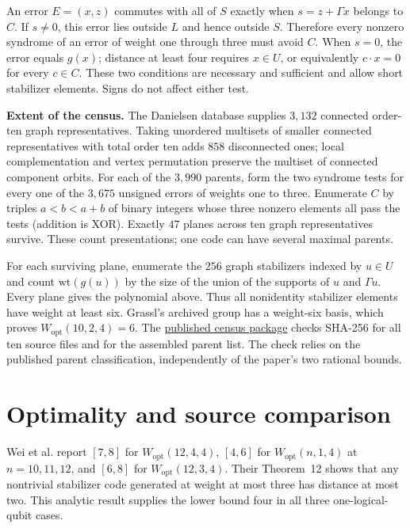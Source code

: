 \documentclass[11pt]{article}
\newcommand{\W}{W_{\mathrm{opt}}}
\begin{document}
An error $E=(x,z)$ commutes with all of $S$ exactly when $s=z+\Gamma x$ belongs to $C$. If $s\ne0$, this error lies outside $L$ and hence outside $S$. Therefore every nonzero syndrome of an error of weight one through three must avoid $C$. When $s=0$, the error equals $g(x)$; distance at least four requires $x\in U$, or equivalently $c\cdot x=0$ for every $c\in C$. These two conditions are necessary and sufficient and allow short stabilizer elements. Signs do not affect either test.

\textbf{Extent of the census.} The Danielsen database supplies $3{,}132$ connected order-ten graph representatives. Taking unordered multisets of smaller connected representatives with total order ten adds $858$ disconnected ones; local complementation and vertex permutation preserve the multiset of connected component orbits. For each of the $3{,}990$ parents, form the two syndrome tests for every one of the $3{,}675$ unsigned errors of weights one to three. Enumerate $C$ by triples $a<b<a+b$ of binary integers whose three nonzero elements all pass the tests (addition is XOR). Exactly $47$ planes across ten graph representatives survive. These count presentations; one code can have several maximal parents.

For each surviving plane, enumerate the $256$ graph stabilizers indexed by $u\in U$ and count $\mathrm{wt}(g(u))$ by the size of the union of the supports of $u$ and $\Gamma u$. Every plane gives the polynomial above. Thus all nonidentity stabilizer elements have weight at least six. Grassl's archived group has a weight-six basis, which proves $\W(10,2,4)=6$. The \href{https://github.com/shunyaekam/oo-research/tree/research/checks/small_qec/census10}{published census package} checks SHA-256 for all ten source files and for the assembled parent list. The check relies on the published parent classification, independently of the paper's two rational bounds.

\section*{Optimality and source comparison}
Wei et al. report $[7,8]$ for $\W(12,4,4)$, $[4,6]$ for $\W(n,1,4)$ at $n=10,11,12$, and $[6,8]$ for $\W(12,3,4)$. Their Theorem~12 shows that any nontrivial stabilizer code generated at weight at most three has distance at most two. This analytic result supplies the lower bound four in all three one-logical-qubit cases.
\end{document}
